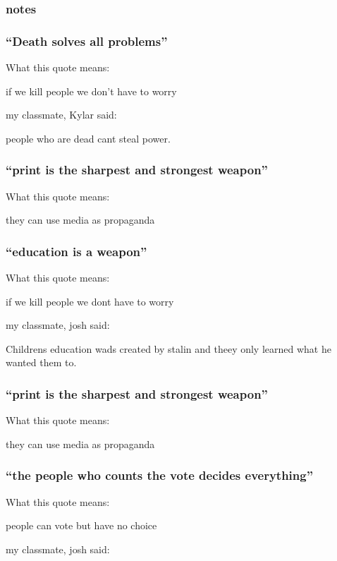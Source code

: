 \subsubsection{notes}

\subsubsection{``Death solves all problems''}

What this quote means:

if we kill people we don't have to worry

my classmate, Kylar said:

people who are dead cant steal power.

\subsubsection{``print is the sharpest and strongest weapon''}

What this quote means:

they can use media as propaganda

\subsubsection{``education is a weapon''}

What this quote means:

if we kill people we dont have to worry

my classmate, josh said:

Childrens education wads created by stalin and theey only learned what he wanted them to.

\subsubsection{``print is the sharpest and strongest weapon''}

What this quote means:

they can use media as propaganda

\subsubsection{``the people who counts the vote decides everything''}

What this quote means:

people can vote but have no choice

my classmate, josh said:


